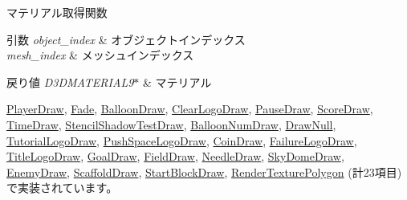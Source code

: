マテリアル取得関数 


\begin{DoxyParams}{引数}
{\em object\+\_\+index} & オブジェクトインデックス \\
\hline
{\em mesh\+\_\+index} & メッシュインデックス \\
\hline
\end{DoxyParams}

\begin{DoxyRetVals}{戻り値}
{\em D3\+D\+M\+A\+T\+E\+R\+I\+A\+L9$\ast$} & マテリアル \\
\hline
\end{DoxyRetVals}


\mbox{\hyperlink{class_player_draw_acb94ea7611a99698507321e44b7e9acb}{Player\+Draw}}, \mbox{\hyperlink{class_fade_adbd049cfdaf165670d1b97b03151a5cd}{Fade}}, \mbox{\hyperlink{class_balloon_draw_aa84c8479ee1a6e95376b7fc0c82e5173}{Balloon\+Draw}}, \mbox{\hyperlink{class_clear_logo_draw_a6273330249f20ddcde3a2ab97c1bdca2}{Clear\+Logo\+Draw}}, \mbox{\hyperlink{class_pause_draw_afa2566700e81ce898e874ce71a8943d5}{Pause\+Draw}}, \mbox{\hyperlink{class_score_draw_a89a4917ed27a9d89cfa3e3acfaecacc2}{Score\+Draw}}, \mbox{\hyperlink{class_time_draw_a32e9166df2da094b6b8c6cfc9dd73872}{Time\+Draw}}, \mbox{\hyperlink{class_stencil_shadow_test_draw_aacdc680646f832451ea575f1da1eec9a}{Stencil\+Shadow\+Test\+Draw}}, \mbox{\hyperlink{class_balloon_num_draw_aa517d5cd0ff871f61145d916f6056922}{Balloon\+Num\+Draw}}, \mbox{\hyperlink{class_draw_null_a0c1efe55fea325ad277594be6fe1e938}{Draw\+Null}}, \mbox{\hyperlink{class_tutorial_logo_draw_acbd9aefdbd4450188e561fb5e5dcd64f}{Tutorial\+Logo\+Draw}}, \mbox{\hyperlink{class_push_space_logo_draw_a4dc41e6b1afece431f3c321145abe541}{Push\+Space\+Logo\+Draw}}, \mbox{\hyperlink{class_coin_draw_ad62dd6a9dd468342849a0c6ad5f8a5dd}{Coin\+Draw}}, \mbox{\hyperlink{class_failure_logo_draw_a60b0cd983365acdad363cdaf8ebdef46}{Failure\+Logo\+Draw}}, \mbox{\hyperlink{class_title_logo_draw_aafb35175c0ffe60c7a3facf7f9cda2f2}{Title\+Logo\+Draw}}, \mbox{\hyperlink{class_goal_draw_ae7f45a84006809475aba8d9ce1b1f8a5}{Goal\+Draw}}, \mbox{\hyperlink{class_field_draw_a5ed29c14e0013513d72f79f8651db805}{Field\+Draw}}, \mbox{\hyperlink{class_needle_draw_aff38ea3f7201eb584e81ae9d6b9328cf}{Needle\+Draw}}, \mbox{\hyperlink{class_sky_dome_draw_a45d3e8d70753af83c84c7a7c9193459f}{Sky\+Dome\+Draw}}, \mbox{\hyperlink{class_enemy_draw_a3f2885da84533364daaaac4a801fbc46}{Enemy\+Draw}}, \mbox{\hyperlink{class_scaffold_draw_a22d8838f68a92b3307008ba952ad718d}{Scaffold\+Draw}}, \mbox{\hyperlink{class_start_block_draw_a42d2c4f04609ba09359470fc38113bbf}{Start\+Block\+Draw}}, \mbox{\hyperlink{class_render_texture_polygon_a86dac06a0a8c8cc64ade472011745fa3}{Render\+Texture\+Polygon}} (計23項目)で実装されています。

